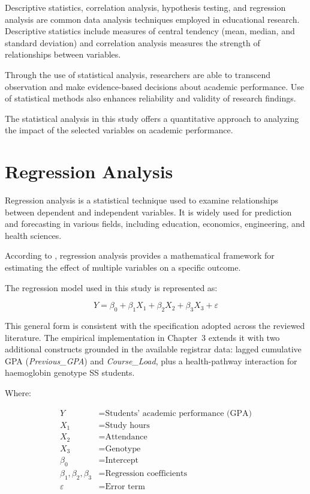 \documentclass[12pt]{report}
\begin{document}
	Descriptive statistics, correlation analysis, hypothesis testing, and regression analysis are common data analysis techniques employed in educational research. Descriptive statistics include measures of central tendency (mean, median, and standard deviation) and correlation analysis measures the strength of relationships between variables.
	
	Through the use of statistical analysis, researchers are able to transcend observation and make evidence-based decisions about academic performance. Use of statistical methods also enhances reliability and validity of research findings.
	
	The statistical analysis in this study offers a quantitative approach to analyzing the impact of the selected variables on academic performance.
	
	\section{Regression Analysis}
	Regression analysis is a statistical technique used to examine relationships between dependent and independent variables. It is widely used for prediction and forecasting in various fields, including education, economics, engineering, and health sciences.
	
	According to \citet{Montgomery2012}, regression analysis provides a mathematical framework for estimating the effect of multiple variables on a specific outcome.
	
	The regression model used in this study is represented as:
	
	\[
	Y = \beta_0 + \beta_1 X_1 + \beta_2 X_2 + \beta_3 X_3 + \varepsilon
	\]
	
	This general form is consistent with the specification adopted across
	the reviewed literature. The empirical implementation in Chapter~3
	extends it with two additional constructs grounded in the available
	registrar data: lagged cumulative GPA (\textit{Previous\_GPA}) and
	\textit{Course\_Load}, plus a health-pathway interaction for
	haemoglobin genotype SS students.
	
	Where:
	
	\begin{align*}
		Y & = \text{Students' academic performance (GPA)} \\
		X_1 & = \text{Study hours} \\
		X_2 & = \text{Attendance} \\
		X_3 & = \text{Genotype} \\
		\beta_0 & = \text{Intercept} \\
		\beta_1, \beta_2, \beta_3 & = \text{Regression coefficients} \\
		\varepsilon & = \text{Error term}
	\end{align*}
	
\end{document}
